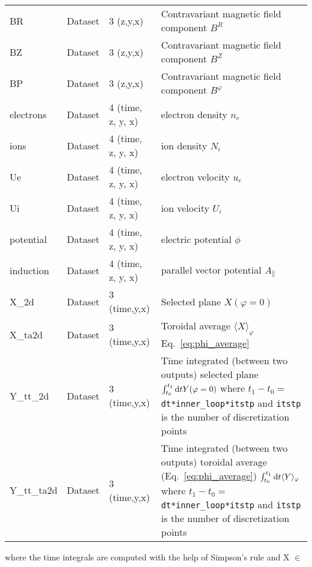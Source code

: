 \begin{longtable}{lll>{\RaggedRight}p{7cm}}
BR               & Dataset & 3 (z,y,x) & Contravariant magnetic field component $B^R$ \\
BZ               & Dataset & 3 (z,y,x) & Contravariant magnetic field component $B^Z$ \\
BP               & Dataset & 3 (z,y,x) & Contravariant magnetic field component $B^\varphi$ \\
electrons        & Dataset & 4 (time, z, y, x) & electron density $n_e$ \\
ions             & Dataset & 4 (time, z, y, x) & ion density $N_i$ \\
Ue               & Dataset & 4 (time, z, y, x) & electron velocity $u_e$ \\
Ui               & Dataset & 4 (time, z, y, x) & ion velocity $U_i$ \\
potential        & Dataset & 4 (time, z, y, x) & electric potential $\phi$ \\
induction        & Dataset & 4 (time, z, y, x) & parallel vector potential $A_\parallel$ \\
X\_2d            & Dataset & 3 (time,y,x) & Selected plane $X(\varphi=0)$ \\
X\_ta2d          & Dataset & 3 (time,y,x) & Toroidal average $\langle X
    \rangle_\varphi$ Eq.~\eqref{eq:phi_average} \\
Y\_tt\_2d        & Dataset & 3 (time,y,x) & Time integrated (between two outputs) selected plane
$\int_{t_0}^{t_1}\mathrm{d} t Y(\varphi=0) $
where $t_1 - t_0 = ${\tt dt*inner\_loop*itstp} and {\tt itstp} is the number of discretization points\\
Y\_tt\_ta2d      & Dataset & 3 (time,y,x) & Time integrated (between two outputs) toroidal average (Eq.~\eqref{eq:phi_average})
$\int_{t_0}^{t_1}\mathrm{d} t \langle Y \rangle_\varphi$
where $t_1 - t_0 = ${\tt dt*inner\_loop*itstp} and {\tt itstp} is the number of discretization points\\
\bottomrule
\end{longtable}
where the time integrals are computed with the help of Simpson's rule
and X $\in$
